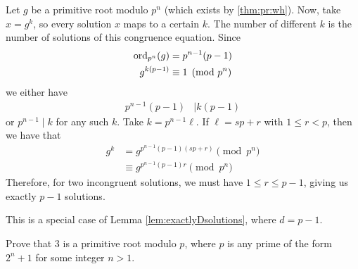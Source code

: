 \begin{solution}[1]
	Let $g$ be a primitive root modulo $p^n$ (which exists by \autoref{thm:pr:wh}). Now, take $x=g^k$, so every solution $x$ maps to a certain $k$. The number of different $k$ is the number of solutions of this congruence equation. Since
		\begin{align*}
			\operatorname{ord}_{p^n}(g)
				& =p^{n-1}(p-1)\\
			g^{k(p-1)}
				& \equiv1\pmod{p^n}
		\end{align*}
	we either have
		\begin{align*}
			p^{n-1}(p-1)
				& \mid k(p-1)
		\end{align*}
	or $p^{n-1} \mid k$ for any such $k$. Take $k=p^{n-1}\ell$. If $\ell=sp+r$ with $1\leq r<p$, then we have that
		\begin{align*}
			g^k
				& =g^{p^{n-1}(p-1)(sp+r)}\pmod{p^{n}}\\
				& \equiv g^{p^{n-1}(p-1)r}\pmod{p^n}
		\end{align*}
	Therefore, for two incongruent solutions, we must have $1\leq r\leq p-1$, giving us exactly $p-1$ solutions.
\end{solution}

\begin{solution}[2]
	This is a special case of Lemma \ref{lem:exactlyDsolutions}, where $d=p-1$.
\end{solution}

\begin{problem}
	Prove that $3$ is a primitive root modulo $p$, where $p$ is any prime of the form $2^n+1$ for some integer $n>1$.
\end{problem}

